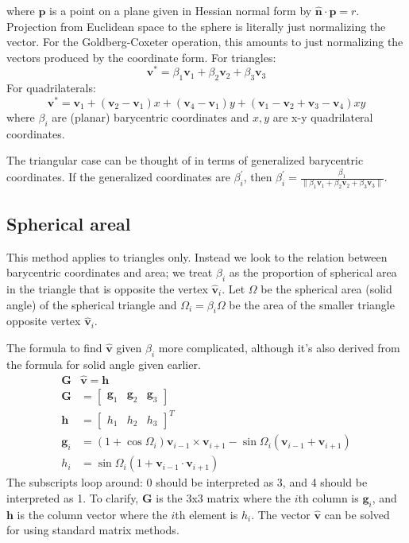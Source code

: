 \documentclass{amsart}[12pt]
\begin{document}
where $\mathbf p$ is a point on a plane given in Hessian normal
form by $\hat{\mathbf n} \cdot \mathbf p = r$. Projection from Euclidean
space to the sphere is literally just normalizing the vector. For the Goldberg-Coxeter operation, this amounts to just normalizing
the vectors produced by the coordinate form. For triangles:
\begin{equation}
   \mathbf v^* =
   \beta_1 \mathbf v_1 + \beta_2 \mathbf v_2 + \beta_3 \mathbf v_3
\end{equation}
For quadrilaterals:
\begin{equation}
   \mathbf v^* = \mathbf v_1 + (\mathbf v_2-\mathbf v_1) x +
   (\mathbf v_4-\mathbf v_1) y +
   (\mathbf v_1-\mathbf v_2+\mathbf v_3-\mathbf v_4)xy
 \end{equation}
where $\beta_i$ are (planar) barycentric coordinates and $x,y$ are
x-y quadrilateral coordinates.

The triangular case can be thought of in terms of generalized
barycentric coordinates. If the generalized coordinates are
$\beta^\prime_i$, then $\beta^\prime_i = \frac{\beta_1}
{\|\beta_1 \mathbf v_1 + \beta_2 \mathbf v_2 + \beta_3 \mathbf v_3\|}$.

\subsection{Spherical areal}
This method applies to triangles only. Instead we look to the relation between
barycentric coordinates and area; we treat $\beta_i$ as the proportion of
spherical area in the triangle that is opposite the vertex $\hat{\mathbf v}_i$.
Let $\Omega$ be the spherical area (solid angle) of the spherical triangle and
$\Omega_i = \beta_i\Omega$ be the area of the smaller triangle opposite vertex
$\hat{\mathbf v}_i$.

The formula to find $\hat{\mathbf v}$ given $\beta_i$ more complicated,
although it's also derived from the formula for solid angle given earlier.
\begin{equation}
\label{eq:sphareal}
  \begin{split}
  \mathbf G & \hat{\mathbf v} = \mathbf h \\
   \mathbf G & = \begin{bmatrix} \mathbf g_1 & \mathbf g_2 & \mathbf g_3 \end{bmatrix} \\
   \mathbf h & = \begin{bmatrix} h_1  & h_2 & h_3  \end{bmatrix}^T \\
   \mathbf g_{i} & = \left(1+\cos \Omega_{i}\right) \mathbf v_{i-1} \times
   \mathbf v_{i+1} - \sin\Omega_{i}\left(\mathbf v_{i-1} + \mathbf v_{i+1}\right)\\
   h_i &= \sin\Omega_i\left(1+\mathbf v_{i-1}\cdot\mathbf v_{i+1}\right)
\end{split}\end{equation}
The subscripts loop around: 0 should be interpreted as 3, and 4 should be
interpreted as 1. To clarify, $\mathbf G$ is the 3x3 matrix where the $i$th
column is $\mathbf g_i$, and $\mathbf h$ is the column vector where the
$i$th element is $h_i$. The vector $\hat{\mathbf v}$
can be solved for using standard matrix methods.
\end{document}
